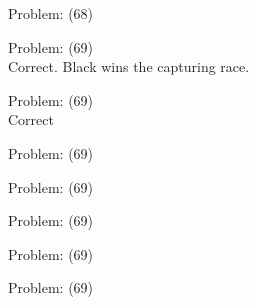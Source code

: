 \documentclass[11pt]{article}
\begin{document}
\begin{minipage}[t]{0.5\textwidth}
  {\centering
  
Problem: (68)\\
  }
\end{minipage}
\begin{minipage}[t]{0.5\textwidth}
  {\centering
  
Problem: (69)\\
Correct. Black wins the capturing race.\\
  }
\end{minipage}
\begin{minipage}[t]{0.5\textwidth}
  {\centering
  
Problem: (69)\\
Correct\\
  }
\end{minipage}
\begin{minipage}[t]{0.5\textwidth}
  {\centering
  
Problem: (69)\\
  }
\end{minipage}
\begin{minipage}[t]{0.5\textwidth}
  {\centering
  
Problem: (69)\\
  }
\end{minipage}
\begin{minipage}[t]{0.5\textwidth}
  {\centering
  
Problem: (69)\\
  }
\end{minipage}
\begin{minipage}[t]{0.5\textwidth}
  {\centering
  
Problem: (69)\\
  }
\end{minipage}
\begin{minipage}[t]{0.5\textwidth}
  {\centering
  
Problem: (69)\\
  }
\end{minipage}
\end{document}
